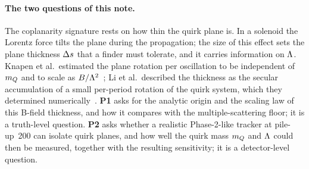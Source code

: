 \paragraph{The two questions of this note.} The coplanarity signature rests on how thin the quirk plane is. In a solenoid
the Lorentz force tilts the plane during the propagation; the size of this effect sets the plane thickness $\Delta s$ that a
finder must tolerate, and it carries information on $\Lambda$. Knapen et al.\ estimated the plane rotation per oscillation
to be independent of $m_Q$ and to scale as $B/\Lambda^2$~\cite{Knapen:2017kly}; Li et al.\ described the thickness as the
secular accumulation of a small per-period rotation of the quirk system, which they determined
numerically~\cite{Li:2020aoq}. \textbf{P1} asks for the analytic origin and the scaling law of this B-field thickness,
and how it compares with the multiple-scattering floor; it is a truth-level question. \textbf{P2} asks whether a
realistic Phase-2-like tracker at pile-up~200 can isolate quirk planes, and how well the quirk mass $m_Q$ and $\Lambda$
could then be measured, together with the resulting sensitivity; it is a detector-level question.

